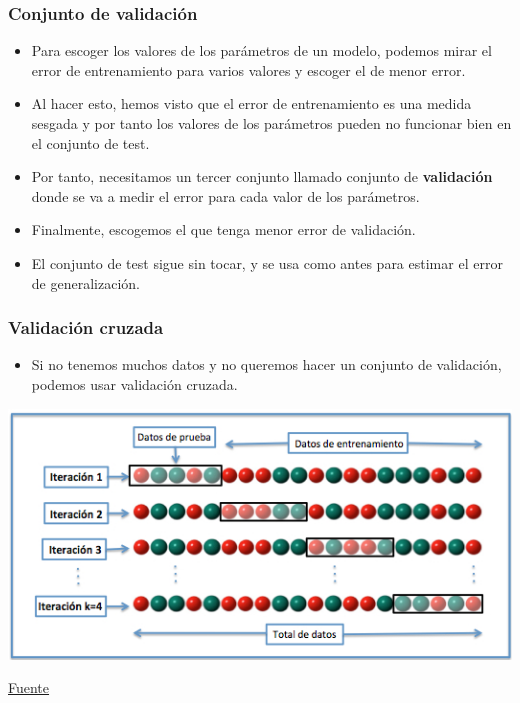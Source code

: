 \documentclass{beamer}
\begin{document}
\begin{frame}
\frametitle{Conjunto de validación}
\begin{itemize}
\item Para escoger los valores de los parámetros de un modelo, podemos mirar el error de entrenamiento para varios valores y escoger el de menor error.
\item Al hacer esto, hemos visto que el error de entrenamiento es una medida sesgada y por tanto los valores de los parámetros pueden no funcionar bien en el conjunto de test.
\item Por tanto, necesitamos un tercer conjunto llamado conjunto de \textbf{validación} donde se va a medir el error para cada valor de los parámetros.
\item Finalmente, escogemos el que tenga menor error de validación.
\item El conjunto de test sigue sin tocar, y se usa como antes para estimar el error de generalización.
\end{itemize}
\end{frame}

\begin{frame}
\frametitle{Validación cruzada}
\begin{itemize}
\item Si no tenemos muchos datos y no queremos hacer un conjunto de validación, podemos usar validación cruzada.
\end{itemize}

\begin{center}
\includegraphics[width=1\textwidth]{crossval.jpg}

{\footnotesize \href{https://commons.wikimedia.org/w/index.php?curid=17616792}{Fuente}}
\end{center}
\end{frame}
\end{document}
